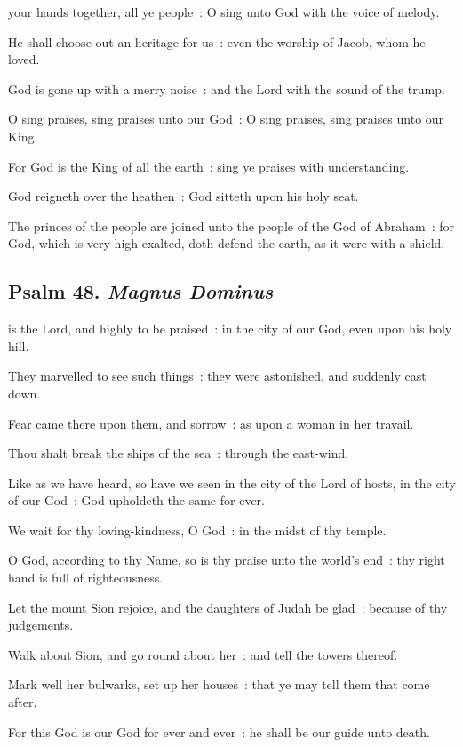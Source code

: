  your hands together, all ye people~: O sing unto God with the voice of melody.\par
{}
He shall choose out an heritage for us~: even the worship of Jacob, whom he loved.\par
{}God is gone up with a merry noise~: and the Lord with the sound of the trump.\par
{}O sing praises, sing praises unto our God~: O sing praises, sing praises unto our King.\par
{}For God is the King of all the earth~: sing ye praises with understanding.\par
{}God reigneth over the heathen~: God sitteth upon his holy seat.\par
{}The princes of the people are joined unto the people of the God of Abraham~: for God, which is very high exalted, doth defend the earth, as it were with a shield.\par

\subsection{Psalm 48. \textit{Magnus Dominus}}

 is the Lord, and highly to be praised~: in the city of our God, even upon his holy hill.\par
{}
They marvelled to see such things~: they were astonished, and suddenly cast down.\par
{}Fear came there upon them, and sorrow~: as upon a woman in her travail.\par
{}Thou shalt break the ships of the sea~: through the east-wind.\par
{}Like as we have heard, so have we seen in the city of the Lord of hosts, in the city of our God~: God upholdeth the same for ever.\par
{}We wait for thy loving-kindness, O God~: in the midst of thy temple.\par
{}O God, according to thy Name, so is thy praise unto the world's end~: thy right hand is full of righteousness.\par
{}Let the mount Sion rejoice, and the daughters of Judah be glad~: because of thy judgements.\par
{}Walk about Sion, and go round about her~: and tell the towers thereof.\par
{}Mark well her bulwarks, set up her houses~: that ye may tell them that come after.\par
{}For this God is our God for ever and ever~: he shall be our guide unto death.\par

